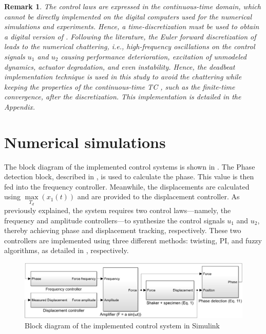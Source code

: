 \documentclass[preprint,12pt]{elsarticle}
\newtheorem{remark}{Remark}
\begin{document}
\begin{remark} \label{R_chattering}
    The control laws  are expressed in the continuous-time domain, which cannot be directly implemented on the digital computers used for the numerical simulations and experiments. Hence, a time-discretization must be used to obtain a digital version of . Following the literature, the Euler forward discretization of  leads to the numerical chattering, {\em i.e.}, high-frequency oscillations on the control signals $u_1$ and $u_2$ causing performance deterioration, excitation of unmodeled dynamics, actuator degradation, and even instability. Hence, the deadbeat implementation technique \cite{MOJALLIZADEH_Franklin} is used in this study to avoid the chattering while keeping the properties of the continuous-time TC , such as the finite-time convergence, after the discretization. This implementation is detailed in the Appendix.
\end{remark}


\section{Numerical simulations} \label{S_simulations}

The block diagram of the implemented control systems is shown in . The {\selectfont Phase detection} block, described in , is used to calculate the phase. This value is then fed into the {\selectfont frequency controller}. Meanwhile, the displacements are calculated using $\max\limits_{T_d}(x_1(t))$ and are provided to the {\selectfont displacement controller}. As previously explained, the system requires two control laws—namely, the frequency and amplitude controllers—to synthesize the control signals $u_1$ and $u_2$, thereby achieving phase and displacement tracking, respectively. These two controllers are implemented using three different methods: twisting, PI, and fuzzy algorithms, as detailed in , respectively.



\begin{figure}
    \centering    \includegraphics[width=\linewidth]{F_simulink.png}
    \caption{Block diagram of the implemented control system in {\selectfont Simulink} }
    \label{F_diagram}
\end{figure}
\end{document}
